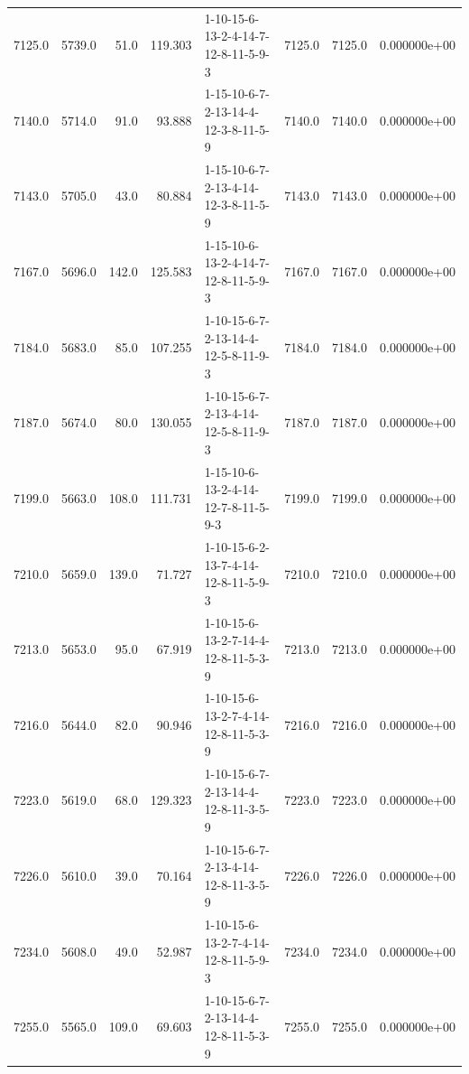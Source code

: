 \begin{tabular}{rrrrlrrr}
 7125.0 &  5739.0 &           51.0 &            119.303 &  1-10-15-6-13-2-4-14-7-12-8-11-5-9-3 &        7125.0 &          7125.0 &  0.000000e+00 \\
 7140.0 &  5714.0 &           91.0 &             93.888 &  1-15-10-6-7-2-13-14-4-12-3-8-11-5-9 &        7140.0 &          7140.0 &  0.000000e+00 \\
 7143.0 &  5705.0 &           43.0 &             80.884 &  1-15-10-6-7-2-13-4-14-12-3-8-11-5-9 &        7143.0 &          7143.0 &  0.000000e+00 \\
 7167.0 &  5696.0 &          142.0 &            125.583 &  1-15-10-6-13-2-4-14-7-12-8-11-5-9-3 &        7167.0 &          7167.0 &  0.000000e+00 \\
 7184.0 &  5683.0 &           85.0 &            107.255 &  1-10-15-6-7-2-13-14-4-12-5-8-11-9-3 &        7184.0 &          7184.0 &  0.000000e+00 \\
 7187.0 &  5674.0 &           80.0 &            130.055 &  1-10-15-6-7-2-13-4-14-12-5-8-11-9-3 &        7187.0 &          7187.0 &  0.000000e+00 \\
 7199.0 &  5663.0 &          108.0 &            111.731 &  1-15-10-6-13-2-4-14-12-7-8-11-5-9-3 &        7199.0 &          7199.0 &  0.000000e+00 \\
 7210.0 &  5659.0 &          139.0 &             71.727 &  1-10-15-6-2-13-7-4-14-12-8-11-5-9-3 &        7210.0 &          7210.0 &  0.000000e+00 \\
 7213.0 &  5653.0 &           95.0 &             67.919 &  1-10-15-6-13-2-7-14-4-12-8-11-5-3-9 &        7213.0 &          7213.0 &  0.000000e+00 \\
 7216.0 &  5644.0 &           82.0 &             90.946 &  1-10-15-6-13-2-7-4-14-12-8-11-5-3-9 &        7216.0 &          7216.0 &  0.000000e+00 \\
 7223.0 &  5619.0 &           68.0 &            129.323 &  1-10-15-6-7-2-13-14-4-12-8-11-3-5-9 &        7223.0 &          7223.0 &  0.000000e+00 \\
 7226.0 &  5610.0 &           39.0 &             70.164 &  1-10-15-6-7-2-13-4-14-12-8-11-3-5-9 &        7226.0 &          7226.0 &  0.000000e+00 \\
 7234.0 &  5608.0 &           49.0 &             52.987 &  1-10-15-6-13-2-7-4-14-12-8-11-5-9-3 &        7234.0 &          7234.0 &  0.000000e+00 \\
 7255.0 &  5565.0 &          109.0 &             69.603 &  1-10-15-6-7-2-13-14-4-12-8-11-5-3-9 &        7255.0 &          7255.0 &  0.000000e+00 \\

\end{tabular}
